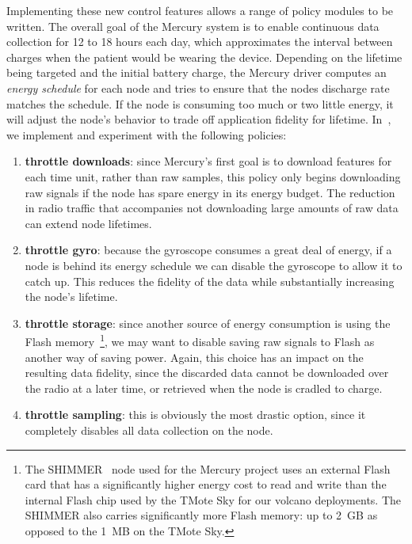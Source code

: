 Implementing these new control features allows a range of policy modules to
be written. The overall goal of the Mercury system is to enable continuous
data collection for 12 to 18 hours each day, which approximates the interval
between charges when the patient would be wearing the device. Depending on
the lifetime being targeted and the initial battery charge, the Mercury
driver computes an \textit{energy schedule} for each node and tries to ensure
that the nodes discharge rate matches the schedule. If the node is consuming
too much or two little energy, it will adjust the node's behavior to trade
off application fidelity for lifetime. In~\cite{mercury-sensys09}, we
implement and experiment with the following policies:

\begin{enumerate}

\item \textbf{throttle downloads}: since Mercury's first goal is to download
features for each time unit, rather than raw samples, this policy only begins
downloading raw signals if the node has spare energy in its energy budget.
The reduction in radio traffic that accompanies not downloading large amounts
of raw data can extend node lifetimes.

\item \textbf{throttle gyro}: because the gyroscope consumes a great deal of
energy, if a node is behind its energy schedule we can disable the gyroscope
to allow it to catch up. This reduces the fidelity of the data while
substantially increasing the node's lifetime.

\item \textbf{throttle storage}: since another source of energy consumption
is using the Flash memory~\footnote{The SHIMMER~\cite{shimmer} node used for
the Mercury project uses an external Flash card that has a significantly
higher energy cost to read and write than the internal Flash chip used by the
TMote Sky for our volcano deployments. The SHIMMER also carries significantly
more Flash memory: up to 2~GB as opposed to the 1~MB on the TMote Sky.}, we
may want to disable saving raw signals to Flash as another way of saving
power. Again, this choice has an impact on the resulting data fidelity, since
the discarded data cannot be downloaded over the radio at a later time, or
retrieved when the node is cradled to charge.

\item \textbf{throttle sampling}: this is obviously the most drastic option,
since it completely disables all data collection on the node.

\end{enumerate}

